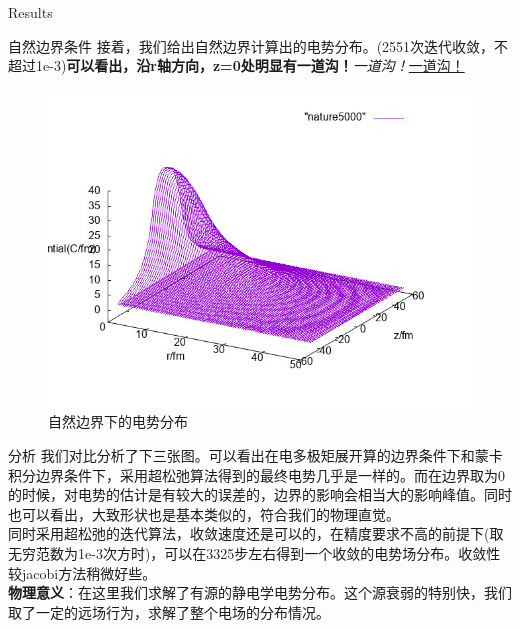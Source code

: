 \documentclass[letterpaper,12pt]{article}
\begin{document}
\begin{section}{Results}
    \begin{subsection}{自然边界条件}
        接着，我们给出自然边界计算出的电势分布。(2551次迭代收敛，不超过1e-3)\textbf{可以看出，沿r轴方向，z=0处明显有一道沟！}\emph{一道沟！}\underline{一道沟！}
     \begin{figure}[!htbp]
        \begin{center}
            \includegraphics[scale=.6]{nature5000.jpg}
        \end{center}
        \label{p2}
        \caption{自然边界下的电势分布}
     \end{figure}
     \end{subsection}
     
     \begin{subsection}{分析}
     	我们对比分析了下三张图。可以看出在电多极矩展开算的边界条件下和蒙卡积分边界条件下，采用超松弛算法得到的最终电势几乎是一样的。而在边界取为0的时候，对电势的估计是有较大的误差的，边界的影响会相当大的影响峰值。同时也可以看出，大致形状也是基本类似的，符合我们的物理直觉。\\
     	\indent 同时采用超松弛的迭代算法，收敛速度还是可以的，在精度要求不高的前提下(取无穷范数为1e-3次方时)，可以在3325步左右得到一个收敛的电势场分布。收敛性较jacobi方法稍微好些。\\
     	\indent \textbf{物理意义}：在这里我们求解了有源的静电学电势分布。这个源衰弱的特别快，我们取了一定的远场行为，求解了整个电场的分布情况。

     \end{subsection}
 \end{section}
\end{document}
